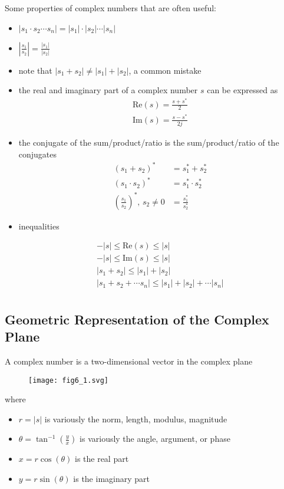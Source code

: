 \documentclass{article}
\begin{document}
Some properties of complex numbers that are often useful:

\begin{itemize}
\item $| s_1 \cdot s_2 \cdots s_n| = | s_1| \cdot |s_2| \cdots |s_n|$
\item $\left| \frac{s_1}{s_2} \right| = \frac{|s_1|}{|s_2|}$
\item note that $|s_1 + s_2| \neq |s_1| + |s_2|$, a common mistake
\item the real and imaginary part of a complex number $s$ can be expressed as
  \begin{align}
    \text{Re}(s) = \frac{s+s^*}{2}\\
    \text{Im}(s) = \frac{s-s^*}{2j}
  \end{align}
\item the conjugate of the sum/product/ratio is the sum/product/ratio of the conjugates
  \begin{align}
    (s_1 + s_2)^* &= s_1^* + s_2^*\\
    (s_1 \cdot s_2)^* &= s_1^* \cdot s_2^*\\
    \left(\frac{s_1}{s_2}\right)^*, \, s_2 \neq 0 &= \frac{s_1^*}{s_2^*} 
  \end{align}
\item inequalities

  \begin{align}
    -|s| \leq \text{Re}(s) \leq |s|\\
    -|s| \leq \text{Im}(s) \leq |s|\\
    |s_1 + s_2| \leq |s_1| + |s_2|\\
    |s_1 + s_2 + \cdots s_n| \leq |s_1| + |s_2| + \cdots |s_n|\\
  \end{align}
\end{itemize}

\subsection{Geometric Representation of the Complex Plane}

A complex number is a two-dimensional vector in the complex plane

\begin{figure}
  \centering
  \texttt{[image: fig6\_1.svg]}
\end{figure}

where

\begin{itemize}
\item $r = |s|$ is variously the norm, length, modulus, magnitude
\item $\theta = \tan^{-1}\left(\frac{y}{x}\right) $ is variously the angle, argument, or phase
\item $x = r\cos(\theta)$ is the real part
\item $y = r\sin(\theta)$ is the imaginary part
\end{itemize}
\end{document}
